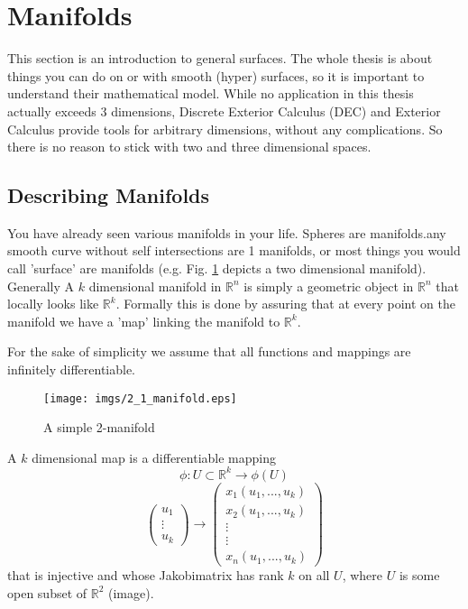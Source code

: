 \section{Manifolds}
		This section is an introduction to general surfaces. The whole thesis is about things you can do on or with smooth (hyper) surfaces, so it is important to understand their mathematical model. While no application in this thesis actually exceeds 3 dimensions, Discrete Exterior Calculus (DEC) and Exterior Calculus provide tools for arbitrary dimensions, without any complications. So there is no reason to stick with two and three dimensional spaces. 
		
\subsection{Describing Manifolds}	
		You have already seen various manifolds in your life. Spheres are manifolds.any smooth curve without self intersections are 1 manifolds, or most things you would call 'surface' are manifolds (e.g.  Fig. \ref{fig::2_1_manifold} depicts a two dimensional manifold). Generally A $k$ dimensional manifold in $\mathbb R^n$ is simply a geometric object in $\mathbb R^n$  that locally looks like $\mathbb R^k$.  Formally this is done by assuring that at every point on the manifold we have a 'map' linking the manifold to $\mathbb R^k$.
		
For the sake of simplicity we assume that all functions and mappings are infinitely differentiable.
		
\begin{figure}
	\begin{center}
		\texttt{[image: imgs/2\_1\_manifold.eps]}
		\caption{A simple 2-manifold}
		\label{fig::2_1_manifold}
	\end{center}
\end{figure}
		
\begin{definition}[Map] A $k$ dimensional map is a differentiable mapping 
\[\phi: U \subset \mathbb R^k \rightarrow \phi(U)\] 
\[\begin{pmatrix}
	u_1\\ \vdots \\ u_k
\end{pmatrix} \rightarrow \begin{pmatrix}x_1(u_1,...,u_k)\\x_2(u_1,...,u_k)\\ \vdots \\ \vdots \\ x_n(u_1,...,u_k)\end{pmatrix}\]
that is injective and whose Jakobimatrix has rank $k$ on all $U$, where $U$ is some open subset of $\mathbb R^2$ (image).
		
\end{definition} 

